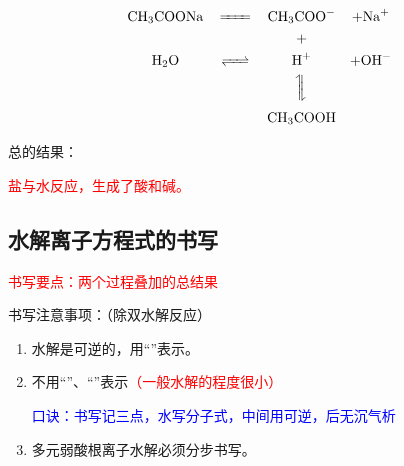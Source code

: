         \vspace{-\baselineskip}
        \[
        \begin{matrix}
            \cemh{CH3COONa} & \xleq{} & \cemh{CH3COO^-} & + \cemh{Na+} \\
            & & \rotatebox{90}{\cemh{+}} & \\
            \cemh{H2O} & \cemh{<=>} & \cemh{H+} & + \cemh{OH^-} \\
            & & \rotatebox{90}{\cemh{<=>}} & \\
            & & \cemh{CH3COOH} &
        \end{matrix}
        \]
        \vspace{-0.5\baselineskip}

        \begin{center}
            
        \end{center}

        \vspace{-0.5\baselineskip}
        总的结果：
        \vspace{-\baselineskip}

        \begin{center}
            
            
            \textcolor{red}{盐与水反应，生成了酸和碱。}
        \end{center}

    \subsection{水解离子方程式的书写}\label{subsec:水解离子方程式的书写}

        \textcolor{red}{书写要点：两个过程叠加的总结果}
        
        书写注意事项：（除双水解反应）

        \begin{enumerate}

            \item 水解是可逆的，用“\cemh{<=>}”表示。
            
            \item 不用“”、“\cemh{^}”表示\textcolor{red}{（一般水解的程度很小）}
            
            \textcolor{blue}{口诀：书写记三点，水写分子式，中间用可逆，后无沉气析}

            \item 多元弱酸根离子水解必须分步书写。
            


        \end{enumerate}
        
